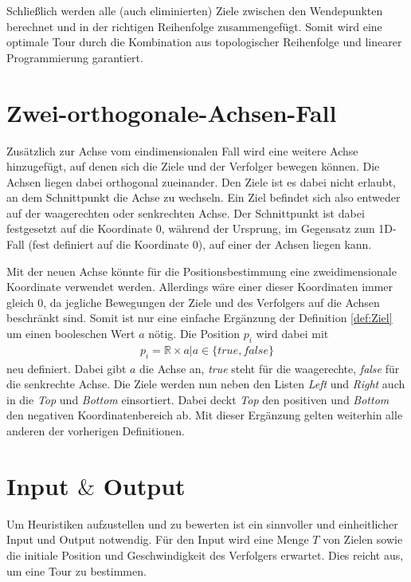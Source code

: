 \documentclass[german,version-2019-11]{uzl-thesis}
\begin{document}
Schließlich werden alle (auch eliminierten) Ziele zwischen den Wendepunkten berechnet und in der richtigen Reihenfolge zusammengefügt. Somit wird eine optimale Tour durch die Kombination aus topologischer Reihenfolge und linearer Programmierung garantiert.


\section{Zwei-orthogonale-Achsen-Fall}

Zusätzlich zur Achse vom eindimensionalen Fall wird eine weitere Achse hinzugefügt, auf denen sich die Ziele und der Verfolger bewegen können. Die Achsen liegen dabei orthogonal zueinander. Den Ziele ist es dabei nicht erlaubt, an dem Schnittpunkt die Achse zu wechseln. Ein Ziel befindet sich also entweder auf der waagerechten oder senkrechten Achse. Der Schnittpunkt ist dabei festgesetzt auf die Koordinate $0$, während der Ursprung, im Gegensatz zum 1D-Fall (fest definiert auf die Koordinate $0$), auf einer der Achsen liegen kann.

Mit der neuen Achse könnte für die Positionsbestimmung eine zweidimensionale Koordinate verwendet werden. Allerdings wäre einer dieser Koordinaten immer gleich $0$, da jegliche Bewegungen der Ziele und des Verfolgers auf die Achsen beschränkt sind. Somit ist nur eine einfache Ergänzung der Definition \ref{def:Ziel} um einen booleschen Wert $a$ nötig. Die Position $p_i$ wird dabei mit 
\begin{align*}
p_i = \mathbb{R} \times a | a\in \{true, false\}
\end{align*}
neu definiert. Dabei gibt $a$ die Achse an, \emph{true} steht für die waagerechte, \emph{false} für die senkrechte Achse. Die Ziele werden nun neben den Listen \emph{Left} und \emph{Right} auch in die \emph{Top} und \emph{Bottom} einsortiert. Dabei deckt \emph{Top} den positiven und \emph{Bottom} den negativen Koordinatenbereich ab. Mit dieser Ergänzung gelten weiterhin alle anderen der vorherigen Definitionen.

\section{Input $\&$ Output}

Um Heuristiken aufzustellen und zu bewerten ist ein sinnvoller und einheitlicher Input und Output notwendig. Für den Input wird eine Menge $T$ von Zielen sowie die initiale Position und Geschwindigkeit des Verfolgers erwartet. Dies reicht aus, um eine Tour zu bestimmen. 
\end{document}
